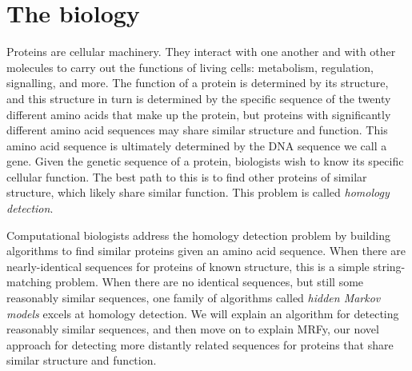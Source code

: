 \documentclass[preprint,nocopyrightspace,times]{sigplanconf}
\begin{document}
\section{The biology}

Proteins are cellular machinery. They interact with one another and with other 
molecules to carry out the functions of living cells: metabolism, regulation, 
signalling, and more. The function of a protein is determined by its structure, 
and this structure in turn is determined by the specific sequence of the twenty 
different amino acids that make up the protein, but proteins with significantly 
different amino acid sequences may share similar structure and function. This 
amino acid sequence is ultimately determined by the DNA sequence we call a 
gene. Given the genetic sequence of a protein, biologists wish to know its 
specific cellular function. The best path to this is to find other proteins of 
similar structure, which likely share similar function. This problem is called 
\textit{homology detection}.

Computational biologists address the homology detection problem by building 
algorithms to find similar proteins given an amino acid sequence. When there 
are nearly-identical sequences for proteins of known structure, this is a 
simple string-matching problem. When there are no identical sequences, but 
still some reasonably similar sequences, one family of algorithms called 
\textit{hidden Markov models} excels at homology detection. We will explain an 
algorithm for detecting reasonably similar sequences, and then move on to 
explain MRFy, our novel approach for detecting more distantly related sequences 
for proteins that share similar structure and function.


\end{document}
